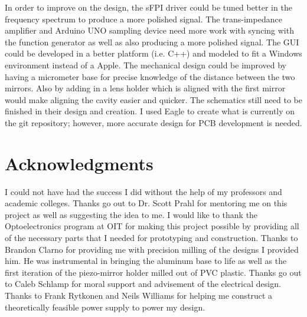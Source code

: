 \documentclass[12pt,journal]{IEEEtran}
\begin{document}
In order to improve on the design, the sFPI driver could be tuned better in the frequency spectrum to produce a more polished signal. The trans-impedance amplifier and Arduino UNO sampling device need more work with syncing with the function generator as well as also producing a more polished signal. The GUI could be developed in a better platform (i.e. C++) and modeled to fit a Windows environment instead of a Apple. The mechanical design could be improved by having a micrometer base for precise knowledge of the distance between the two mirrors. Also by adding in a lens holder which is aligned with the first mirror would make aligning the cavity easier and quicker. The schematics still need to be finished in their design and creation. I used Eagle to create what is currently on the git repository; however, more accurate design for PCB development is needed. 


\section{Acknowledgments}

I could not have had the success I did without the help of my professors and academic colleges. Thanks go out to Dr. Scott Prahl for mentoring me on this project as well as suggesting the idea to me. I would like to thank the Optoelectronics program at OIT for making this project possible by providing all of the necessary parts that I needed for prototyping and construction. Thanks to Brandon Clarno for providing me with precision milling of the designs I provided him. He was instrumental in bringing the aluminum base to life as well as the first iteration of the piezo-mirror holder milled out of PVC plastic. Thanks go out to Caleb Schlamp for moral support and advisement of the electrical design. Thanks to Frank Rytkonen and Neils Williams for helping me construct a theoretically feasible power supply to power my design. 


\end{document}
